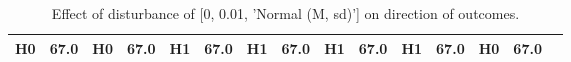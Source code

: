\begin{table}
\begin{tabular}{l|cc|cc|cc|cc|cc|cc|cc}
\cellcolor{Bittersweet}H0&\cellcolor{Bittersweet}67.0&\cellcolor{Bittersweet}H0&\cellcolor{Bittersweet}67.0&\cellcolor{Bittersweet}H1&\cellcolor{Bittersweet}67.0&\cellcolor{Bittersweet}H1&\cellcolor{Bittersweet}67.0&\cellcolor{Bittersweet}H1&\cellcolor{Bittersweet}67.0&\cellcolor{Bittersweet}H1&\cellcolor{Bittersweet}67.0&\cellcolor{Bittersweet}H0&\cellcolor{Bittersweet}67.0\\\bottomrule\end{tabular}\caption{Effect of disturbance of [0, 0.01, 'Normal (M, sd)'] on direction of outcomes.}\end{table}